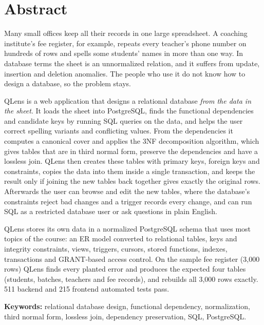 \chapter*{Abstract}

Many small offices keep all their records in one large spreadsheet. A coaching institute's fee
register, for example, repeats every teacher's phone number on hundreds of rows and spells some
students' names in more than one way. In database terms the sheet is an unnormalized relation, and it
suffers from update, insertion and deletion anomalies. The people who use it do not know how to design
a database, so the problem stays.

QLens is a web application that designs a relational database \emph{from the data in the sheet}. It
loads the sheet into PostgreSQL, finds the functional dependencies and candidate keys by running SQL
queries on the data, and helps the user correct spelling variants and conflicting values. From the
dependencies it computes a canonical cover and applies the 3NF decomposition algorithm, which gives
tables that are in third normal form, preserve the dependencies and have a lossless join. QLens then
creates these tables with primary keys, foreign keys and  constraints, copies the data into
them inside a single transaction, and keeps the result only if joining the new tables back together
gives exactly the original rows. Afterwards the user can browse and edit the new tables, where the
database's constraints reject bad changes and a trigger records every change, and can run SQL as a
restricted database user or ask questions in plain English.

QLens stores its own data in a normalized PostgreSQL schema that uses most topics of the course:
an ER model converted to relational tables, keys and integrity constraints, views, triggers, cursors,
stored functions, indexes, transactions and GRANT-based access control. On the sample fee register
(3{,}000 rows) QLens finds every planted error and produces the expected four tables (students,
batches, teachers and fee records), and rebuilds all 3{,}000 rows exactly. 511 backend and 215 frontend
automated tests pass.

\medskip
\noindent\textbf{Keywords:} relational database design, functional dependency, normalization,
third normal form, lossless join, dependency preservation, SQL, PostgreSQL.
